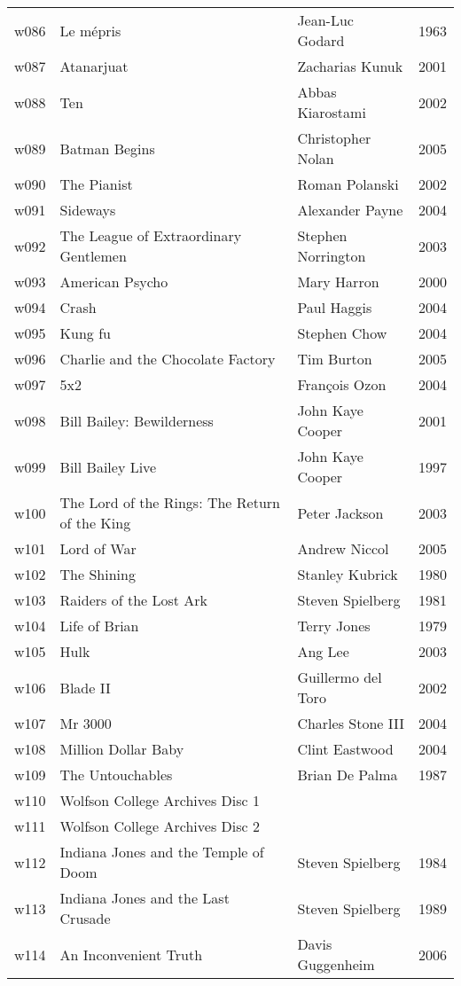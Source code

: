 \documentclass{article}
\begin{document}
\begin {center}
\begin{longtable}{l p{10cm} l l}
w086 & Le mépris & Jean-Luc Godard & 1963 \\
w087 & Atanarjuat & Zacharias Kunuk & 2001 \\
w088 & Ten & Abbas Kiarostami & 2002 \\
w089 & Batman Begins & Christopher Nolan & 2005 \\
w090 & The Pianist & Roman Polanski & 2002 \\
w091 & Sideways & Alexander Payne & 2004 \\
w092 & The League of Extraordinary Gentlemen & Stephen Norrington & 2003 \\
w093 & American Psycho & Mary Harron & 2000 \\
w094 & Crash & Paul Haggis & 2004 \\
w095 & Kung fu & Stephen Chow & 2004 \\
w096 & Charlie and the Chocolate Factory & Tim Burton & 2005 \\
w097 & 5x2 & François Ozon & 2004 \\
w098 & Bill Bailey: Bewilderness & John Kaye Cooper & 2001 \\
w099 & Bill Bailey Live & John Kaye Cooper & 1997 \\
w100 & The Lord of the Rings: The Return of the King & Peter Jackson & 2003 \\
w101 & Lord of War & Andrew Niccol & 2005 \\
w102 & The Shining & Stanley Kubrick & 1980 \\
w103 & Raiders of the Lost Ark & Steven Spielberg & 1981 \\
w104 & Life of Brian & Terry Jones & 1979 \\
w105 & Hulk & Ang Lee & 2003 \\
w106 & Blade II & Guillermo del Toro & 2002 \\
w107 & Mr 3000 & Charles Stone III & 2004 \\
w108 & Million Dollar Baby & Clint Eastwood & 2004 \\
w109 & The Untouchables & Brian De Palma & 1987 \\
w110 & Wolfson College Archives Disc 1 &  &  \\
w111 & Wolfson College Archives Disc 2 &  &  \\
w112 & Indiana Jones and the Temple of Doom & Steven Spielberg & 1984 \\
w113 & Indiana Jones and the Last Crusade & Steven Spielberg & 1989 \\
w114 & An Inconvenient Truth & Davis Guggenheim & 2006 \\

\end{longtable}
\end{center}
\end{document}
